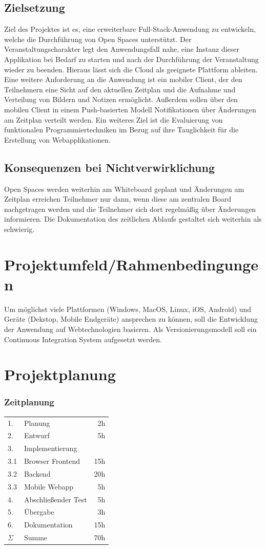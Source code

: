 \documentclass[12pt,a4paper]{scrartcl}
\begin{document}
\subsection*{Zielsetzung}
Ziel des Projektes ist es, eine erweiterbare Full-Stack-Anwendung zu entwickeln, welche die Durchführung von Open Spaces unterstützt. Der Veranstaltungscharakter legt den Anwendungsfall nahe, eine Instanz dieser Applikation bei Bedarf zu starten und nach der Durchführung der Veranstaltung wieder zu beenden. Hieraus lässt sich die Cloud als geeignete Plattform ableiten. Eine weitere Anforderung an die Anwendung ist ein mobiler Client, der den Teilnehmern eine Sicht auf den aktuellen Zeitplan und die Aufnahme und Verteilung von Bildern und Notizen ermöglicht. Außerdem sollen über den mobilen Client in einem Push-basierten Modell Notifikationen über Änderungen am Zeitplan verteilt werden.
Ein weiteres Ziel ist die Evaluierung von funktionalen Programmiertechniken im Bezug auf ihre Tauglichkeit für die Erstellung von Webapplikationen.
\subsection*{Konsequenzen bei Nichtverwirklichung}
Open Spaces werden weiterhin am Whiteboard geplant und Änderungen am Zeitplan erreichen  Teilnehmer nur dann, wenn diese am zentralen Board nachgetragen werden und die Teilnehmer sich dort regelmäßig über Änderungen informieren. Die Dokumentation des zeitlichen Ablaufs gestaltet sich weiterhin als schwierig.
\section*{Projektumfeld/Rahmenbedingungen}
Um möglichst viele Plattformen (Windows, MacOS, Linux, iOS, Android) und Geräte (Dekstop, Mobile Endgeräte) ansprechen zu können, soll die Entwicklung der Anwendung auf Webtechnologien basieren. Als Versionierungsmodell soll ein Continuous Integration System aufgesetzt werden.
\section*{Projektplanung}
\subsubsection*{Zeitplanung}
\begin{tabular}{l l r}
1. & Planung & 2h \\
2. & Entwurf & 5h \\
\toprule 3. & Implementierung & \\
3.1 & Browser Frontend & 15h \\
3.2 & Backend & 20h \\
3.3 & Mobile Webapp & 5h \\
\toprule 4. & Abschließender Test & 5h \\
5. & Übergabe & 3h \\
6. & Dokumentation & 15h \\
\toprule $\Sigma$ & Summe & 70h
\end{tabular}
\end{document}

